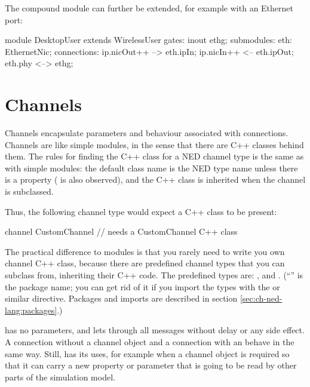 The  compound module can further be extended,
for example with an Ethernet port:

\begin{ned}
module DesktopUser extends WirelessUser
{
   gates:
       inout ethg;
   submodules:
       eth: EthernetNic;
   connections:
       ip.nicOut++ --> eth.ipIn;
       ip.nicIn++ <-- eth.ipOut;
       eth.phy <--> ethg;
}
\end{ned}



\section{Channels}
\label{sec:ch-ned-lang:channels}

Channels encapsulate parameters and behaviour associated with connections.
Channels are like simple modules, in the sense that there are C++ classes
behind them. The rules for finding the C++ class for a NED channel type is
the same as with simple modules: the default class name is the NED type
name unless there is a  property ( is also
observed), and the C++ class is inherited when the channel is subclassed.

Thus, the following channel type would expect a  C++ class
to be present:

\begin{ned}
channel CustomChannel  // needs a CustomChannel C++ class
{
}
\end{ned}

The practical difference to modules is that you rarely need to write you own
channel C++ class, because there are predefined channel types that you can
subclass from, inheriting their C++ code. The predefined types are:
,  and .
(``'' is the package name; you can get rid of it if you import the types
with the  or similar directive. Packages and imports
are described in section \ref{sec:ch-ned-lang:packages}.)

 has no parameters, and lets through all messages without
delay or any side effect. A connection without a channel object
and a connection with an  behave in the same way.
Still,  has its uses, for example when a channel object
is required so that it can carry a new property or parameter that is
going to be read by other parts of the simulation model.

